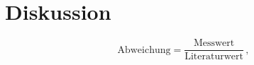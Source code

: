 
\section{Diskussion}
\label{sec:Diskussion}
\begin{equation}
    \text{Abweichung}= \frac{\text{Messwert}}{\text{Literaturwert}}\, , 
  \end{equation}

